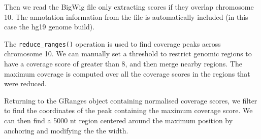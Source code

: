 \documentclass[10pt,letterpaper]{article}
\newenvironment{Shaded}{\begin{snugshade}}{\end{snugshade}}
\newcommand{\KeywordTok}[1]{\textcolor[rgb]{0.13,0.29,0.53}{\textbf{#1}}}
\newcommand{\DataTypeTok}[1]{\textcolor[rgb]{0.13,0.29,0.53}{#1}}
\newcommand{\DecValTok}[1]{\textcolor[rgb]{0.00,0.00,0.81}{#1}}
\newcommand{\StringTok}[1]{\textcolor[rgb]{0.31,0.60,0.02}{#1}}
\newcommand{\OperatorTok}[1]{\textcolor[rgb]{0.81,0.36,0.00}{\textbf{#1}}}
\newcommand{\NormalTok}[1]{#1}
\begin{document}
\begin{Shaded}
\end{Shaded}

Then we read the BigWig file only extracting scores if they overlap
chromosome 10. The annotation information from the file is automatically
included (in this case the hg19 genome build).

\begin{Shaded}
\end{Shaded}

The \texttt{reduce\_ranges()} operation is used to find coverage peaks
across chromosome 10. We can manually set a threshold to restrict
genomic regions to have a coverage score of greater than 8, and then
merge nearby regions. The maximum coverage is computed over all the
coverage scores in the regions that were reduced.

\begin{Shaded}
\end{Shaded}

Returning to the GRanges object containing normalised coverage scores,
we filter to find the coordinates of the peak containing the maximum
coverage score. We can then find a 5000 nt region centered around the
maximum position by anchoring and modifying the the width.
\end{document}

